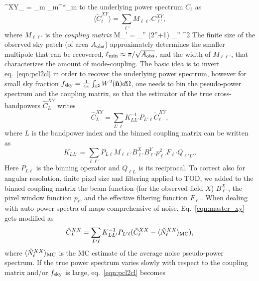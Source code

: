 %
\be
{}^{XY}_{\ell} =  \sum_m _{\ell m}^*_{\ell m}
\ee
%
to the underlying power spectrum $C_{\ell}$ as 
%
\begin{equation}
\label{eqn:pcl2cl}
\langle \tilde{C}^{XY}_{\ell}\rangle = \sum_{\ell'} M_{\ell\ell'} C^{XY}_{\ell'},
\end{equation}
%
where $M_{\ell\ell'}$ is the \emph{coupling matrix} 
%
\be
M_{\ell\ell'} =  \sum_{\ell''} (2\ell''+1) _{\ell''} ^2
\ee
%
The finite size of the observed sky patch (of area $A_{\rm{obs}}$) approximately determines the smaller multipole that can be recovered, 
$\ell_{\rm{min}}\approx \pi/\sqrt{A_{\rm{obs}}}$, and the width of $M_{\ell\ell'}$, that characterizes the amount of mode-coupling.  
The basic idea is to invert eq.~\eqref{eqn:pcl2cl} in order to 
recover the underlying power spectrum, however for small sky fraction  $f_{\rm{sky}}=\frac{1}{4\pi}\int_{\mathbb{S}^2}W^2(\nver)d\Omega$, 
one needs to bin the pseudo-power spectrum and the coupling matrix, so that the estimator of the true
 cross-bandpowers $\hat{C}^{XY}_{L}$ writes
%
\begin{equation}
\label{eqn:master_xy}
\hat{C}^{XY}_{L} = \sum_{L' \ell}K^{-1}_{LL'}P_{L'\ell}\tilde{C}^{XY}_{\ell},
\end{equation}
%
where $L$ is the bandpower index and the binned coupling matrix can be written as
%
\begin{equation}
K_{LL'} = \sum_{\ell\ell'} P_{L\ell}M_{\ell\ell'}B^X_{\ell'}B^Y_{\ell'}p^2_{\ell'}F_{\ell'}Q_{\ell' L'}.
\end{equation}
%
Here $P_{L\ell}$ is the binning operator and $Q_{\ell L}$ is its reciprocal. To correct also for angular resolution, finite pixel size and filtering applied to TOD, we added to the binned coupling matrix the beam function (for the observed field $X$) $B^X_{\ell'}$, the pixel window function $p_{\ell}$, and the effective filtering function $F_{\ell'}$. When dealing with auto-power spectra of maps comprehensive of noise, Eq.~\eqref{eqn:master_xy} gets modified as
%
\begin{equation}
\label{eqn:master_xx}
\hat{C}^{XX}_{L} = \sum_{L' \ell}K^{-1}_{LL'}P_{L'\ell}(\tilde{C}^{XX}_{\ell} - \langle \tilde{N}^{XX}_{\ell} \rangle_{\rm{MC}}),
\end{equation}
%
where $\langle \tilde{N}^{XX}_{\ell} \rangle_{\rm{MC}}$ is the \gls{MC} estimate of the average noise pseudo-power spectrum.
If the true power spectrum varies slowly with respect to the coupling matrix and/or $f_{\rm{sky}}$ is large, eq.~\eqref{eqn:pcl2cl} becomes  
